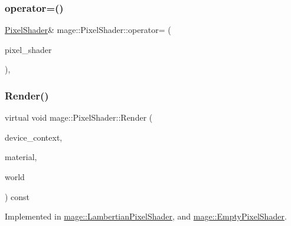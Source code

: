 \hypertarget{classmage_1_1_pixel_shader_ac3a3535b2751237f4aad110dca05d0c3}{}\label{classmage_1_1_pixel_shader_ac3a3535b2751237f4aad110dca05d0c3} 
\subsubsection{\texorpdfstring{operator=()}{operator=()}}
{\footnotesize\ttfamily \hyperlink{classmage_1_1_pixel_shader}{Pixel\+Shader}\& mage\+::\+Pixel\+Shader\+::operator= (\begin{DoxyParamCaption}\item[{const \hyperlink{classmage_1_1_pixel_shader}{Pixel\+Shader} \&}]{pixel\+\_\+shader }\end{DoxyParamCaption})\hspace{0.3cm}{\ttfamily [private]}, {\ttfamily [delete]}}

\hypertarget{classmage_1_1_pixel_shader_a2e47b753e60dc05cf2cc9d4acb87c343}{}\label{classmage_1_1_pixel_shader_a2e47b753e60dc05cf2cc9d4acb87c343} 
\subsubsection{\texorpdfstring{Render()}{Render()}}
{\footnotesize\ttfamily virtual void mage\+::\+Pixel\+Shader\+::\+Render (\begin{DoxyParamCaption}\item[{\hyperlink{namespacemage_ae74f374780900893caa5555d1031fd79}{Com\+Ptr}$<$ I\+D3\+D11\+Device\+Context2 $>$}]{device\+\_\+context,  }\item[{const \hyperlink{structmage_1_1_material}{Material} \&}]{material,  }\item[{const \hyperlink{classmage_1_1_world}{World} \&}]{world }\end{DoxyParamCaption}) const\hspace{0.3cm}{\ttfamily [pure virtual]}}



Implemented in \hyperlink{classmage_1_1_lambertian_pixel_shader_a9fc8db84f2cd8f6e5722e7436e72e407}{mage\+::\+Lambertian\+Pixel\+Shader}, and \hyperlink{classmage_1_1_empty_pixel_shader_a492a634cc8ef167f92c63f8d863e8e6b}{mage\+::\+Empty\+Pixel\+Shader}.



